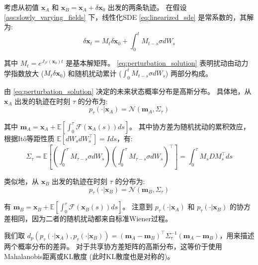 \documentclass[12pt, a4paper]{article}
\newcommand{\fastvar}{\bm{x}}          %
\newcommand{\drift}{\mathcal{F}}  %
\newcommand{\diffop}{\sigma}      %
\newcommand{\difftensor}{D}       %
\newcommand{\wiener}{W}           %
\newcommand{\jacobian}{J}         %
\newcommand{\fundsol}{M}          %
\newcommand{\predtime}{\tau}      %
\newcommand{\probdens}{p}           %
\newcommand{\covmat}{\Sigma}        %
\newcommand{\normdist}{\mathcal{N}} %
\begin{document}
考虑从初值 $\fastvar_A$ 和 $\fastvar_B = \fastvar_A + \delta\fastvar_0$ 出发的两条轨迹。
在假设 \ref{ass:slowly_varying_fields} 下，线性化SDE \eqref{eq:linearized_sde} 是常系数的，其解为:
\begin{equation}
\label{eq:perturbation_solution}
    \delta\fastvar_t = \fundsol_t \delta\fastvar_0 + \int_0^t \fundsol_{t-s} \diffop d\wiener_s
\end{equation}

其中 $\fundsol_t = e^{\jacobian_{\drift}(\fastvar_0) t}$ 是基本解矩阵。
\eqref{eq:perturbation_solution} 表明扰动由动力学指数放大 ($\fundsol_t \delta\fastvar_0$) 和随机扰动累计 ($\int_0^t \fundsol_{t-s}\diffop d\wiener_s$) 两部分构成。

由 \eqref{eq:perturbation_solution} 决定的未来状态概率分布是高斯分布。
具体地，从 $\fastvar_A$ 出发的轨迹在时刻 $\predtime$ 的分布为:
\begin{equation}
\label{eq:gaussian_distribution_of_perturbation_A}
    \probdens_{\predtime}(\cdot|\fastvar_A) = \normdist(\bm{m}_A, \covmat_{\predtime})
\end{equation}

其中 $\bm{m}_A = \fastvar_A + \mathbb{E}\left[\int_0^{\predtime} \drift(\fastvar_A(s)) ds\right]$。
其中协方差为随机扰动的累积效应，根据Itô等距性质 $\mathbb{E}[d\wiener_s d\wiener_s^\top] = I ds$，有:
\begin{equation}
\label{eq:covariance_of_perturbation}
    \covmat_{\predtime} = \mathbb{E}\left[\left(\int_0^{\predtime} \fundsol_{\predtime-s}\diffop d\wiener_s\right) \left(\int_0^{\predtime} \fundsol_{\predtime-s}\diffop d\wiener_s\right)^\top\right] = \int_0^{\predtime} \fundsol_s \difftensor \fundsol_s^\top ds
\end{equation}

类似地，从 $\fastvar_B$ 出发的轨迹在时刻 $\predtime$ 的分布为:
\begin{equation}
\label{eq:gaussian_distribution_of_perturbation_B}
    \probdens_{\predtime}(\cdot|\fastvar_B) = \normdist(\bm{m}_B, \covmat_{\predtime})
\end{equation}

有 $\bm{m}_B = \fastvar_B + \mathbb{E}\left[\int_0^{\predtime} \drift(\fastvar_B(s)) ds\right]$。
注意到 $\probdens_{\predtime}(\cdot|\fastvar_A)$ 和 $\probdens_{\predtime}(\cdot|\fastvar_B)$ 的协方差相同，因为二者的随机扰动都来自标准Wiener过程。

我们取 $d_p(\probdens_{\predtime}(\cdot|\fastvar_A), \probdens_{\predtime}(\cdot|\fastvar_B)) = (\bm{m}_A - \bm{m}_B)^\top \covmat_{\predtime}^{-1} (\bm{m}_A - \bm{m}_B)$，用来描述两个概率分布的差异。
对于共享协方差矩阵的高斯分布，这等价于使用Mahalanobis距离或KL散度 (此时KL散度也是对称的)。
\end{document}
